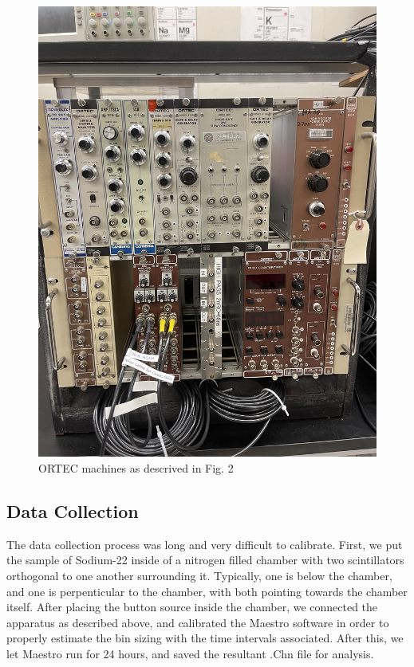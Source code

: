 \documentclass[10pt,letterpaper]{article}
\begin{document}
\begin{figure}[!htbp]
    \begin{center}
        \includegraphics[width=5in, angle=270]{IMG_8887.JPG}
        \caption{ORTEC machines as descrived in Fig. 2}
    \end{center}
\end{figure}

\subsection{Data Collection}
The data collection process was long and very difficult to calibrate. First, we put the sample of Sodium-22 inside of 
a nitrogen filled chamber with two scintillators orthogonal to one another surrounding it. 
Typically, one is below the chamber, and one is perpenticular to the chamber, with both pointing towards the chamber itself.
After placing the button source inside the chamber, we connected the apparatus as described above, 
and calibrated the Maestro software in order to properly estimate the bin sizing with the time intervals associated.
After this, we let Maestro run for 24 hours, and saved the resultant .Chn file for analysis.
\end{document}
